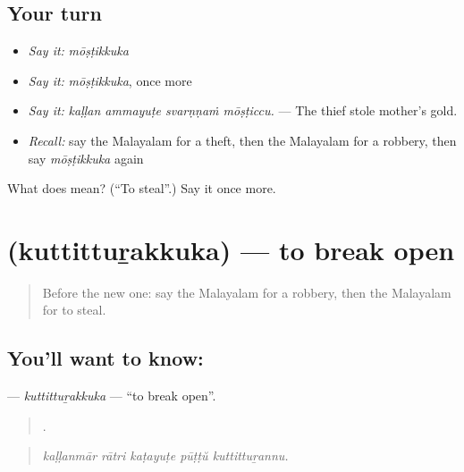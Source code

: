 \subsection*{Your turn}
\begin{itemize}
\raggedright
  \item \emph{Say it:} \emph{mōṣṭikkuka}
  \item \emph{Say it:} \emph{mōṣṭikkuka}, once more
  \item \emph{Say it:} \emph{kaḷḷan ammayuṭe svarṇṇaṁ mōṣṭiccu.} — The thief stole mother's gold.
  \item \emph{Recall:} say the Malayalam for a theft, then the Malayalam for a robbery, then say \emph{mōṣṭikkuka} again
\end{itemize}

\begin{tcolorbox}[breakable,colback=teal!4,colframe=teal!35!black,title={Before you move on}]
What does  mean? (\textquotedblleft{}To steal\textquotedblright{}.) Say it once more.
\end{tcolorbox}
\section[\texorpdfstring{\ml{കുത്തിത്തുറക്കുക} (kuttittuṟakkuka)}{കുത്തിത്തുറക്കുക (kuttittuṟakkuka)}]{ (kuttittuṟakkuka) — to break open}

\label{lesson:ML-C364-kuttitturakkuka}



\begin{quote}
Before the new one: say the Malayalam for a robbery, then the Malayalam for to steal.
\end{quote}

\subsection*{You'll want to know: }
\textbf{} — \emph{kuttittuṟakkuka} — \textquotedblleft{}to break open\textquotedblright{}.

\begin{quote}
    .
\end{quote}

\begin{quote}
\emph{kaḷḷanmār rātri kaṭayuṭe pūṭṭŭ kuttittuṟannu.}
\end{quote}

